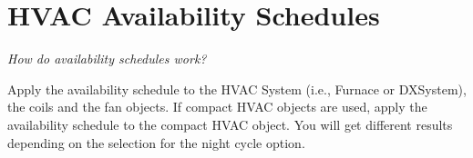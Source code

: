 \section{HVAC Availability Schedules}\label{hvac-availability-schedules}

\emph{How do availability schedules work?}

Apply the availability schedule to the HVAC System (i.e., Furnace or DXSystem), the coils and the fan objects. If compact HVAC objects are used, apply the availability schedule to the compact HVAC object. You will get different results depending on the selection for the night cycle option.
